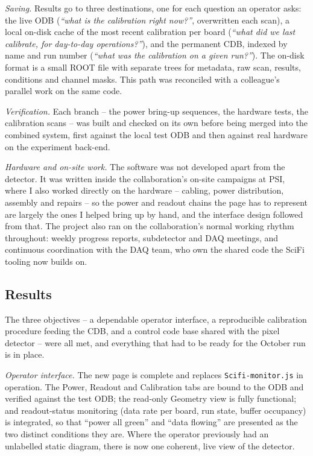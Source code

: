 \documentclass[12pt,a4paper]{article}
\newcommand{\pill}[1]{\textit{#1}\;}   %
\begin{document}
\pill{Saving.}
Results go to three destinations, one for each question an operator asks: the
live ODB (\emph{``what is the calibration right now?''}, overwritten each scan),
a local on-disk cache of the most recent calibration per board (\emph{``what did
we last calibrate, for day-to-day operations?''}), and the permanent CDB,
indexed by name and run number (\emph{``what was the calibration on a given
run?''}). The on-disk format is a small ROOT file with separate trees for
metadata, raw scan, results, conditions and channel masks. This path was
reconciled with a colleague's parallel work on the same code.

\pill{Verification.}
Each branch -- the power bring-up sequences, the hardware tests, the calibration
scans -- was built and checked on its own before being merged into the combined
system, first against the local test ODB and then against real hardware on the
experiment back-end.

\pill{Hardware and on-site work.}
The software was not developed apart from the detector. It was written inside the
collaboration's on-site campaigns at PSI, where I also worked directly on the
hardware -- cabling, power distribution, assembly and repairs -- so the power and
readout chains the page has to represent are largely the ones I helped bring up
by hand, and the interface design followed from that. The project also ran on the
collaboration's normal working rhythm throughout: weekly progress reports,
subdetector and DAQ meetings, and continuous coordination with the DAQ team, who
own the shared code the SciFi tooling now builds on.

\subsection{Results}

The three objectives -- a dependable operator interface, a reproducible
calibration procedure feeding the CDB, and a control code base shared with the
pixel detector -- were all met, and everything that had to be ready for the
October run is in place.

\pill{Operator interface.}
The new page is complete and replaces \texttt{Scifi-monitor.js} in operation.
The Power, Readout and Calibration tabs are bound to the ODB and verified against
the test ODB; the read-only Geometry view is fully functional; and readout-status
monitoring (data rate per board, run state, buffer occupancy) is integrated, so
that ``power all green'' and ``data flowing'' are presented as the two distinct
conditions they are. Where the operator previously had an unlabelled static
diagram, there is now one coherent, live view of the detector.
\end{document}
